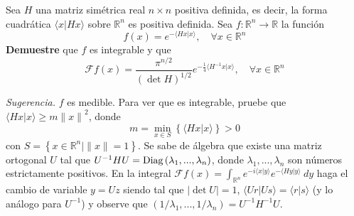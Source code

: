 \documentclass[12pt]{report}
\newcounter{it}
\theoremstyle{largebreak}
\renewcommand{\geq}{\ensuremath{\geqslant}}
\newcommand\abs[1]{\ensuremath{\left|#1\right|}}
\newcommand\cf[3]{\ensuremath{#1:#2\rightarrow#3}}
\newcommand\norm[1]{\ensuremath{\|#1\|}}
\newcommand\pint[2]{\ensuremath{\langle#1| #2\rangle}}
\newcommand{\fou}[1]{\ensuremath{\mathcal{F}#1}}
\newcommand{\diag}[1]{\ensuremath{\left(#1\right)}}
\begin{document}
    \begin{excer}
        Sea $H$ una matriz simétrica real $n\times n$ positiva definida, es decir, la forma cuadrática $\pint{x}{Hx}$ sobre $\mathbb{R}^n$ es positiva definida. Sea $\cf{f}{\mathbb{R}^n}{\mathbb{R}}$ la función
        \begin{equation*}
            f(x)=e^{ -\pint{Hx}{x}},\quad\forall x\in\mathbb{R}^n
        \end{equation*}
        \textbf{Demuestre} que $f$ es integrable y que
        \begin{equation*}
            \fou{f}(x)=\frac{\pi^{ n/2}}{\left(\det H\right)^{ 1/2}}e^{ -\frac{1}{4}\pint{H^{-1}x}{x}},\quad\forall x\in\mathbb{R}^n
        \end{equation*}
        
        \textit{Sugerencia.} $f$ es medible. Para ver que es integrable, pruebe que $\pint{Hx}{x}\geq m\norm{x}^2$, donde
        \begin{equation*}
            m=\min_{ x\in S} \left\{\pint{Hx}{x} \right\}>0
        \end{equation*}
        con $S=\left\{x\in\mathbb{R}^n\Big|\norm{x}=1 \right\}$. Se sabe de álgebra que existe una matriz ortogonal $U$ tal que $U^{-1}HU=\textup{Diag}\left(\lambda_1,...,\lambda_n\right)$, donde $\lambda_1,...,\lambda_n$ son números estrictamente positivos. En la integral $\fou{f}(x)=\int_{\mathbb{R}^n}e^{ -i\pint{x}{y}}e^{ -\pint{Hy}{y}}\:dy$ haga el cambio de variable $y=Uz$ siendo tal que $\abs{\det U}=1$, $\pint{Ur}{Us}=\pint{r}{s}$ (y lo análogo para $U^{-1}$) y observe que $\diag{1/\lambda_1,...,1/\lambda_n}=U^{-1}H^{-1}U$.
    \end{excer}
\end{document}

